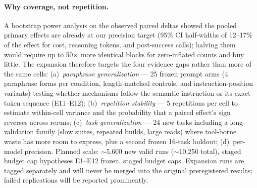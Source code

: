 \documentclass[11pt]{article}
\newcommand{\xd}{$\times$}
\begin{document}
\paragraph{Why coverage, not repetition.} A bootstrap power analysis on the
observed paired deltas showed the pooled primary effects are already at our
precision target (95\% CI half-widths of 12--17\% of the effect for cost,
reasoning tokens, and post-success calls); halving them would require up to
50\xd{} more identical blocks for zero-inflated counts and buy little. The
expansion therefore targets the four evidence gaps rather than more of the
same cells: (a)~\emph{paraphrase generalization} --- 25 frozen prompt arms
(4 paraphrase forms per condition, length-matched controls, and
instruction-position variants) testing whether mechanisms follow the
semantic instruction or its exact token sequence (E11--E12);
(b)~\emph{repetition stability} --- 5 repetitions per cell to estimate
within-cell variance and the probability that a paired effect's sign
reverses across reruns; (c)~\emph{task generalization} --- 24 new tasks
including a long-validation family (slow suites, repeated builds, large
reads) where tool-borne waste has more room to express, plus a second
frozen 16-task holdout; (d)~per-model precision. Planned scale:
$\sim$5{,}600 new valid runs ($\sim$10{,}250 total), staged budget cap
hypotheses E1--E12 frozen, staged budget caps. Expansion runs are tagged separately and
will never be merged into the original preregistered results; failed
replications will be reported prominently.
\end{document}
